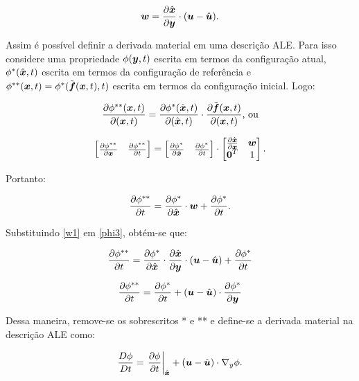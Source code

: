 \begin{equation}
    \BB{w}=\der{\bhat{x}}{\BB{y}}\cdot(\BB{u}-\uhat)\text{.}
    \label{w1}
\end{equation}

Assim é possível definir a derivada material em uma descrição ALE. Para isso considere uma propriedade $\phi(\boldsymbol{y},t)$ escrita em termos da configuração atual, $\phi^*(\hat{\boldsymbol{x}},t)$ escrita em termos da configuração de referência e $\phi^{**}(\boldsymbol{x},t)=\phi^*(\tilde{\boldsymbol{f}}(\boldsymbol{x},t),t)$ escrita em termos da configuração inicial. Logo:

\begin{equation}
    \der{\phi^{**}(\BB{x},t)}{(\BB{x},t)}=\der{\phi^*(\bhat{x},t)}{(\bhat{x},t)}\cdot\der{\that{f}(\BB{x},t)}{(\BB{x},t)}\text{, ou}
    \label{phi1}
\end{equation}

\begin{equation}
    \begin{bmatrix}\der{\phi^{**}}{\BB{x}}&\der{\phi^{**}}{t}\end{bmatrix}=
    \begin{bmatrix}\der{\phi^{*}}{\bhat{x}}&\der{\phi^{*}}{t}\end{bmatrix}\cdot
    \begin{bmatrix}\der{\bhat{x}}{\BB{x}}&\BB{w}\\\BB{0}^T&1\end{bmatrix}
    \text{.}
    \label{phi2}
\end{equation}

\noindent Portanto:

\begin{equation}
    \der{\phi^{**}}{t}=\der{\phi^{*}}{\bhat{x}}\cdot\BB{w}+\der{\phi^{*}}{t}\text{.}
    \label{phi3}
\end{equation}

Substituindo \ref{w1} em \ref{phi3}, obtém-se que:

\[\frac{\partial{\phi^{**}}}{\partial{t}}=\frac{\partial{\phi^{*}}}{\partial{\hat{\boldsymbol{x}}}}\cdot\frac{\partial{\hat{\boldsymbol{x}}}}{\partial{\boldsymbol{y}}}\cdot(\boldsymbol{u}-\hat{\boldsymbol{u}})+\frac{\partial{\phi^{*}}}{\partial{t}}\]

\[\frac{\partial{\phi^{**}}}{\partial{t}}=\frac{\partial{\phi^{*}}}{\partial{t}}+(\boldsymbol{u}-\hat{\boldsymbol{u}})\cdot\frac{\partial{\phi^{*}}}{\partial{\boldsymbol{y}}}\]

Dessa maneira, remove-se os sobrescritos * e ** e define-se a derivada material na descrição ALE como:

\begin{equation}
    \frac{D\phi}{Dt}=\left.\frac{\partial{\phi}}{\partial{t}}\right|_{\hat{\boldsymbol{x}}}+(\boldsymbol{u}-\hat{\boldsymbol{u}})\cdot\boldsymbol{}{\nabla_y}\phi\text{.}\label{DerMat2}
\end{equation}

